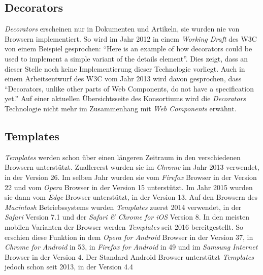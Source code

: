 \documentclass[12pt, paper=a4, bibtotoc, toc=listof, headsepline=true]{scrreprt}
\begin{document}
		\subsection{Decorators}
		\emph{Decorators} erscheinen nur in Dokumenten und Artikeln, sie wurden nie von Browsern implementiert. So wird im Jahr 2012 in einem \emph{Working Draft} des \ac{W3C} von einem Beispiel gesprochen: \enquote{Here is an example of how decorators could be used to implement a simple variant of the details element}.\cite[vgl.]{Cooney2012} Dies zeigt, dass an dieser Stelle noch keine Implementierung dieser Technologie vorliegt. Auch in einem Arbeitsentwurf des \ac{W3C} vom Jahr 2013 wird davon gesprochen, dass \enquote{Decorators, unlike other parts of Web Components, do not have a specification yet.}\cite{Cooney2013}
		Auf einer aktuellen Übersichtsseite des Konsortiums wird die \emph{Decorators} Technologie nicht mehr im Zusammenhang mit \emph{Web Components} erwähnt.\cite[vgl.]{WebComCur2016}
		\subsection{Templates}
		\emph{Templates} werden schon über einen längeren Zeitraum in den verschiedenen Browsern unterstützt. Zuallererst wurden sie im \emph{Chrome} im Jahr 2013 verwendet, in der Version 26. Im selben Jahr wurden sie vom \emph{Firefox} Browser in der Version 22 und vom \emph{Opera} Browser in der Version 15 unterstützt.\cite[vgl.]{W2015}\cite[vgl.]{htmlTemFire}
		Im Jahr 2015 wurden sie dann vom \emph{Edge} Browser unterstützt, in der Version 13.\cite[vgl.]{build10547}
		Auf den Browsern des \emph{Macintosh} Betriebssystems wurden \emph{Templates} zuerst 2014 verwendet, in der \emph{Safari} Version 7.1 und der \emph{Safari \& Chrome for iOS} Version 8.\cite[vgl.]{htmlTemplCaniuse} In den meisten mobilen Varianten der Browser werden \emph{Templates} seit 2016 bereitgestellt. So erschien diese Funktion in dem \emph{Opera for Android} Browser in der Version 37, in \emph{Chrome for Android} in 53, in \emph{Firefox for Android} in 49 und im \emph{Samsung Internet} Browser in der Version 4. Der Standard Android Browser unterstützt \emph{Templates} jedoch schon seit 2013, in der Version 4.4\cite[vgl.]{htmlTemplCaniuse}
\end{document}

